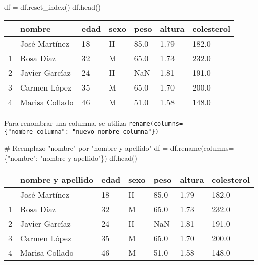 \documentclass[
  letterpaper,
  DIV=11,
  numbers=noendperiod]{scrreprt}
\newenvironment{Shaded}{\begin{snugshade}}{\end{snugshade}}
\newcommand{\CommentTok}[1]{\textcolor[rgb]{0.37,0.37,0.37}{#1}}
\newcommand{\NormalTok}[1]{\textcolor[rgb]{0.00,0.23,0.31}{#1}}
\newcommand{\OperatorTok}[1]{\textcolor[rgb]{0.37,0.37,0.37}{#1}}
\newcommand{\StringTok}[1]{\textcolor[rgb]{0.13,0.47,0.30}{#1}}
\begin{document}
\begin{Shaded}
\begin{Highlighting}[]
\NormalTok{df }\OperatorTok{=}\NormalTok{ df.reset\_index()}
\NormalTok{df.head()}
\end{Highlighting}
\end{Shaded}

\begin{longtable}[]{@{}lllllll@{}}
\toprule\noalign{}
& nombre & edad & sexo & peso & altura & colesterol \\
\midrule\noalign{}
\endhead
\bottomrule\noalign{}
\endlastfoot
0 & José Martínez & 18 & H & 85.0 & 1.79 & 182.0 \\
1 & Rosa Díaz & 32 & M & 65.0 & 1.73 & 232.0 \\
2 & Javier Garcíaz & 24 & H & NaN & 1.81 & 191.0 \\
3 & Carmen López & 35 & M & 65.0 & 1.70 & 200.0 \\
4 & Marisa Collado & 46 & M & 51.0 & 1.58 & 148.0 \\
\end{longtable}

Para renombrar una columna, se utiliza
\texttt{rename(columns=\{"nombre\_columna":\ "nuevo\_nombre\_columna"\})}

\begin{Shaded}
\begin{Highlighting}[]
\CommentTok{\# Reemplazo "nombre" por "nombre y apellido"}
\NormalTok{df }\OperatorTok{=}\NormalTok{ df.rename(columns}\OperatorTok{=}\NormalTok{\{}\StringTok{"nombre"}\NormalTok{: }\StringTok{"nombre y apellido"}\NormalTok{\})}
\NormalTok{df.head()}
\end{Highlighting}
\end{Shaded}

\begin{longtable}[]{@{}lllllll@{}}
\toprule\noalign{}
& nombre y apellido & edad & sexo & peso & altura & colesterol \\
\midrule\noalign{}
\endhead
\bottomrule\noalign{}
\endlastfoot
0 & José Martínez & 18 & H & 85.0 & 1.79 & 182.0 \\
1 & Rosa Díaz & 32 & M & 65.0 & 1.73 & 232.0 \\
2 & Javier Garcíaz & 24 & H & NaN & 1.81 & 191.0 \\
3 & Carmen López & 35 & M & 65.0 & 1.70 & 200.0 \\
4 & Marisa Collado & 46 & M & 51.0 & 1.58 & 148.0 \\
\end{longtable}
\end{document}
